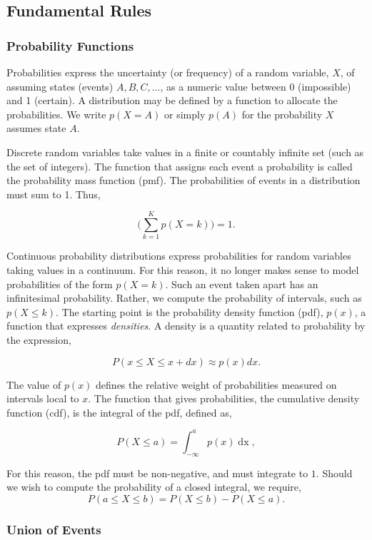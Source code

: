 \documentclass[11pt]{amsart}
\begin{document}
\subsection{Fundamental Rules}

\subsubsection{Probability Functions}

Probabilities express the uncertainty (or frequency) of a random variable, $X$, of assuming states (events) $A, B, C, \dots$, as a numeric value between 0 (impossible) and 1 (certain). A distribution may be defined by a function to allocate the probabilities. We write $p(X=A)$ or simply $p(A)$ for the probability $X$ assumes state $A$.

Discrete random variables take values in a finite or countably infinite set (such as the set of integers). The function that assigns each event a probability is called the probability mass function (pmf). The probabilities of events in a distribution must sum to 1. Thus,

$$\Bigg(\sum_{k = 1}^{K} p(X = k)\Bigg) = 1.$$

Continuous probability distributions express probabilities for random variables taking values in a continuum. For this reason, it no longer makes sense to model probabilities of the form $p(X = k)$. Such an event taken apart has an infinitesimal probability. Rather, we compute the probability of intervals, such as $p(X \leq k)$. The starting point is the probability density function (pdf), $p(x)$, a function that expresses \emph{densities}. A density is a quantity related to probability by the expression,

$$P(x \leq X \leq x+dx) \approx p(x)dx.$$

The value of $p(x)$ defines the relative weight of probabilities measured on intervals local to $x$. The function that gives probabilities, the cumulative density function (cdf), is the integral of the pdf, defined as,

$$
P(X \leq a) = \int_{-\infty}^{a} p(x) \mathop{dx},
$$

For this reason, the pdf must be non-negative, and must integrate to $1$. Should we wish to compute the probability of a closed integral, we require, $$P(a \leq X \leq b) = P(X \leq b) - P(X \leq a).$$

\subsubsection{Union of Events}
\end{document}
